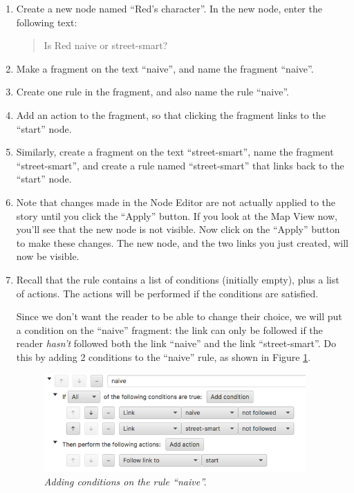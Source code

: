 \documentclass{article}
\begin{document}
\begin{enumerate}
  \item Create a new node named ``Red's character''. In the new node, enter the following text:

\begin{quotation}
\noindent Is Red naive or street-smart?
\end{quotation}

\item Make a fragment on the text ``naive'', and name the fragment ``naive''.

\item Create one rule in the fragment, and also name the rule ``naive''.

\item Add an action to the fragment, so that clicking the fragment links to the ``start'' node.

\item Similarly, create a fragment on the text ``street-smart'', name the fragment ``street-smart'', and create a rule named ``street-smart'' that links back to the ``start'' node.

\item Note that changes made in the Node Editor are not actually applied to the story until you click the ``Apply'' button. If you look at the Map View now, you'll see that the new node is not visible. Now click on the ``Apply'' button to make these changes. The new node, and the two links you just created, will now be visible.

\item Recall that the rule contains a list of conditions (initially empty), plus a list of actions. The actions will be performed if the conditions are satisfied.

Since we don't want the reader to be able to change their choice, we will put a condition on the ``naive'' fragment: the link can only be followed if the reader \textit{hasn't} followed both the link ``naive'' and the link ``street-smart''. Do this by adding 2 conditions to the ``naive'' rule, as shown in Figure \ref{fig:tut2:red_is_naive}.

\begin{figure}[h]
  \centering
  \includegraphics[width=10cm]{images/hypedyn-tutorial-2-figure-2}
  \caption{\textit{Adding conditions on the rule ``naive''.}}
  \label{fig:tut2:red_is_naive}
\end{figure} 


\end{enumerate}
\end{document}
